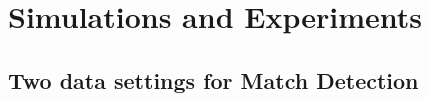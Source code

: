 \documentclass[12pt,oneside,final]{thesis}\usepackage[]{graphicx}\usepackage[]{color}
\begin{document}

\chapter{Simulations and Experiments}
\label{sec:simexp_results}


\section{Two data settings for Match Detection}
\end{document}
